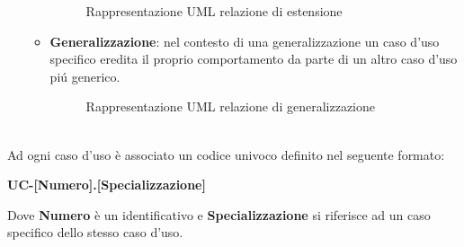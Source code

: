 \begin{itemize}
\begin{itemize}
            \begin{figure}[ht!]
                \centering
                \caption{Rappresentazione UML relazione di estensione}
                \label{fig:Rappresentazione UML relazione di estensione}
            \end{figure}
        \item \textbf{Generalizzazione}: nel contesto di una generalizzazione un caso d'uso specifico eredita il proprio comportamento da parte di un altro caso d'uso piú generico. 
            \begin{figure}[ht!]
                \centering
                \caption{Rappresentazione UML relazione di generalizzazione}
                \label{fig:Rappresentazione UML relazione di generalizzazione}
            \end{figure}
        \end{itemize}
\end{itemize}

\\
Ad ogni caso d'uso è associato un codice univoco definito nel seguente formato:
\begin{center}
    \textbf{UC-[Numero].[Specializzazione]}
\end{center}
Dove \textbf{Numero} è un identificativo e \textbf{Specializzazione} si riferisce ad un caso specifico
dello stesso caso d'uso.

